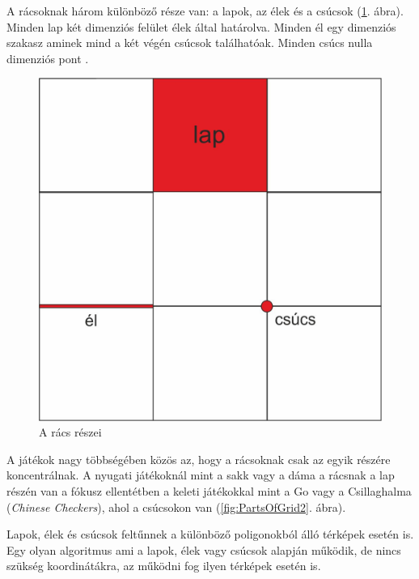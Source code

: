 A rácsoknak három különböző része van: a lapok, az élek és a csúcsok (\ref{fig:PartsOfGrid}. ábra). Minden lap két dimenziós felület élek által határolva. Minden él egy dimenziós szakasz aminek mind a két végén csúcsok találhatóak. Minden csúcs nulla dimenziós pont \cite{Grids}. 

\begin{figure}[h!]
\centering
\includegraphics[scale=0.35]{kepek/PartsOfGrid.jpg}
\caption{A rács részei}
\label{fig:PartsOfGrid}
\end{figure}

A játékok nagy többségében közös az, hogy a rácsoknak csak az egyik részére koncentrálnak. A nyugati játékoknál mint a sakk vagy a dáma a rácsnak a lap részén van a fókusz ellentétben a keleti játékokkal mint a Go vagy a Csillaghalma (\textit{Chinese Checkers}), ahol a csúcsokon van (\ref{fig:PartsOfGrid2}. ábra).

Lapok, élek és csúcsok feltűnnek a különböző poligonokból álló térképek esetén is. Egy olyan algoritmus ami a lapok, élek vagy csúcsok alapján működik, de nincs szükség koordinátákra, az működni fog ilyen térképek esetén is.

